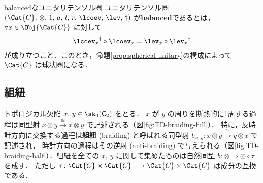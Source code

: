 \documentclass[TQFT_main]{subfiles}
\begin{document}
\begin{mydef}[label=def:ev-coev-balanced]{balancedなユニタリテンソル圏}
    \hyperref[def:unitary-monoidal]{ユニタリ}\hyperref[def:tensorfusion-cat]{テンソル圏} $(\Cat{C},\, \otimes,\, 1,\, a,\, l,\, r,\, \lcoev,\, \lev,\, \dagger)$ 
    が\textbf{balanced}であるとは，$\forall x \in \Obj{\Cat{C}}$ に対して
    \begin{align}
        \lcoev_x{}^\dagger \circ \lcoev_x = \lev_x \circ \lev_x{}^\dagger
    \end{align}
    が成り立つこと．このとき，命題\ref{prop:spherical-unitary}の構成によって $\Cat{C}$ は\hyperref[def:spherical]{球状圏}になる．
\end{mydef}


\subsection{組紐}

\hyperref[def:TD]{トポロジカル欠陥} $x,\, y \in \sk_0(\mathsf{C}_2)$ をとる．
$x$ が $y$ の周りを断熱的に1周する過程は同型射 $x \otimes y \xrightarrow{\cong} x \otimes y$ で記述される（図\ref{fig:TD-braiding-full}）．
特に，反時計方向に交換する過程は\textbf{組紐} (braiding) と呼ばれる同型射 $b_{x,\, y} \colon x \otimes y \xrightarrow{\cong} y \otimes x$ で記述され，
時計方向の過程はその逆射 (anti-braiding) で与えられる（図\ref{fig:TD-braiding-half}）．組紐を全ての $x,\, y$ に関して集めたものは\hyperref[def:nat]{自然同型} $b \colon \otimes \Longrightarrow \otimes \circ \tau$ を成す．
ただし $\tau \colon \Cat{C} \times \Cat{C} \lto \Cat{C} \times \Cat{C}$ は成分の互換である．
\end{document}
